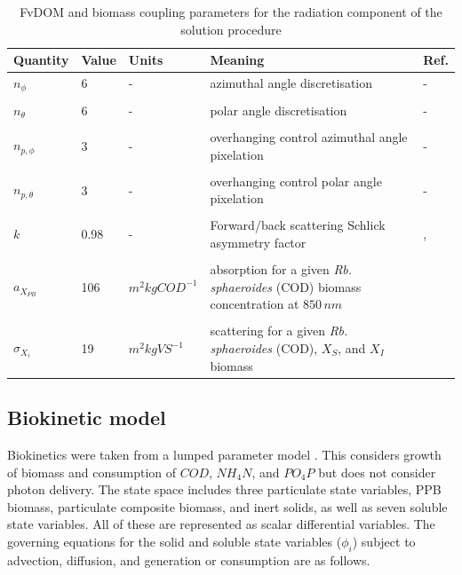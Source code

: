 \begin{table}[tp]
\caption{FvDOM and biomass coupling parameters for the radiation component of the solution procedure}
\centering
\label{tab:photoBioProperties}
\begin{tabular}{p{2.5cm} p{1.2cm}  p{2.3cm} p{4.5cm} p{1.3cm}}

\hline
\textbf{Quantity} & \textbf{Value} & \textbf{Units} & \textbf{Meaning} & \textbf{Ref.}\\ \hline
$n_\phi$ & 6 & - &azimuthal angle discretisation & - \\ \\
$n_\theta$ & 6 & - & polar angle discretisation & - \\ \\
$n_{p,\phi}$& 3 & - & overhanging control azimuthal angle pixelation & - \\ \\
$n_{p,\theta}$& 3 & - & overhanging control polar angle pixelation & -\\ \\
$k$ & 0.98 & - & Forward/back scattering Schlick asymmetry factor & \cite{Jarosz2008}, \cite{Berberoglu2007a}\\ \\ 
$a_{X_{PB}}$ & 106 & $m^2 kgCOD^{-1}$ & absorption for a given \textit{Rb. sphaeroides} (COD) biomass concentration at $850\, nm$ & \cite{Berberoglu2007a}\\ \\
$\sigma_{X_{i}}$ & 19 & $m^2 kgVS^{-1}$ & scattering for a given \textit{Rb. sphaeroides} (COD), $X_S$, and $X_I$ biomass & \cite{Berberoglu2007a}\\
\hline
\end{tabular}
\end{table}
\newpage
\subsection{Biokinetic model}
Biokinetics were taken from a lumped parameter model \cite{Puyol2017}. This considers growth of biomass and consumption of $COD$, $NH_4N$, and $PO_4P$ but does not consider photon delivery. The state space includes three particulate state variables, PPB biomass, particulate composite biomass, and inert solids, as well as seven soluble state variables. All of these are represented as scalar differential variables. The governing equations for the solid and soluble state variables ($\phi_i$) subject to advection, diffusion, and generation or consumption are as follows.

